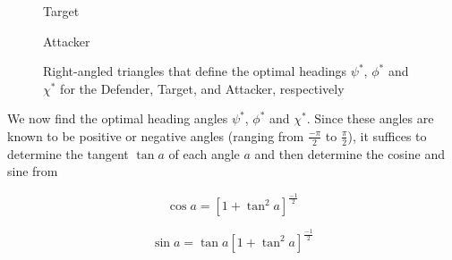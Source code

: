 \begin{figure}[ht!]
\begin{minipage}{.5\textwidth}
			Target
			
		\end{minipage}
		
			\begin{minipage}{.5\textwidth}
				\centering
				
				Attacker
				
			\end{minipage}
			
	\caption{Right-angled triangles that define the optimal headings $\psi^*$, $\phi^*$ and $\chi^*$ for the Defender, Target, and Attacker, respectively}
	
	\label{optimal heading angles}
	
\end{figure}






We now find the optimal heading angles $\psi^*$, $\phi^*$ and $\chi^*$. Since these angles are known to be positive or negative angles (ranging from $\frac{-\pi}{2}$ to $\frac{\pi}{2}$), it suffices to determine the tangent $\tan a$ of each angle $a$ and then determine the cosine and sine from

\begin{equation}
	\cos a = [1+ \tan^2 a ]^{\frac{-1}{2}}
	\label{cos a}
\end{equation}

\begin{equation}
\sin a =\tan a [1+ \tan^2 a ]^{\frac{-1}{2}}
\label{sin a}
\end{equation}

